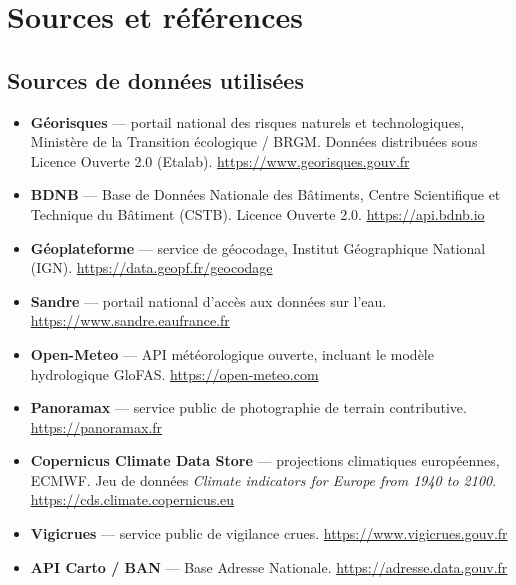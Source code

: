 \chapter*{Sources et références}

\section*{Sources de données utilisées}

\begin{itemize}[leftmargin=1.4em]
  \item \textbf{Géorisques} — portail national des risques naturels et
        technologiques, Ministère de la Transition écologique / BRGM.
        Données distribuées sous Licence Ouverte 2.0 (Etalab).
        \url{https://www.georisques.gouv.fr}
  \item \textbf{BDNB} — Base de Données Nationale des Bâtiments, Centre
        Scientifique et Technique du Bâtiment (CSTB). Licence Ouverte 2.0.
        \url{https://api.bdnb.io}
  \item \textbf{Géoplateforme} — service de géocodage, Institut Géographique
        National (IGN). \url{https://data.geopf.fr/geocodage}
  \item \textbf{Sandre} — portail national d'accès aux données sur l'eau.
        \url{https://www.sandre.eaufrance.fr}
  \item \textbf{Open-Meteo} — API météorologique ouverte, incluant le modèle
        hydrologique GloFAS. \url{https://open-meteo.com}
  \item \textbf{Panoramax} — service public de photographie de terrain
        contributive. \url{https://panoramax.fr}
  \item \textbf{Copernicus Climate Data Store} — projections climatiques
        européennes, ECMWF. Jeu de données \emph{Climate indicators for Europe
        from 1940 to 2100}. \url{https://cds.climate.copernicus.eu}
  \item \textbf{Vigicrues} — service public de vigilance crues.
        \url{https://www.vigicrues.gouv.fr}
  \item \textbf{API Carto / BAN} — Base Adresse Nationale.
        \url{https://adresse.data.gouv.fr}
\end{itemize}

